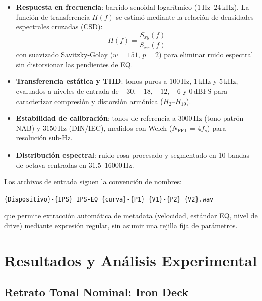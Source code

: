 \documentclass[10pt,conference]{IEEEtran}
\begin{document}
\begin{itemize}
    \item \textbf{Respuesta en frecuencia}: barrido senoidal logarítmico
    ($1\,\text{Hz}$–$24\,\text{kHz}$). La función de transferencia $H(f)$ se estimó mediante
    la relación de densidades espectrales cruzadas (CSD):
    \begin{equation}
        H(f) = \frac{S_{xy}(f)}{S_{xx}(f)}
    \end{equation}
    con suavizado Savitzky-Golay ($w=151$, $p=2$) para eliminar ruido espectral
    sin distorsionar las pendientes de EQ.

    \item \textbf{Transferencia estática y THD}: tonos puros a $100\,\text{Hz}$,
    $1\,\text{kHz}$ y $5\,\text{kHz}$, evaluados a niveles de entrada de $-30$, $-18$,
    $-12$, $-6$ y $0\,\text{dBFS}$ para caracterizar compresión y distorsión armónica
    ($H_2$–$H_{19}$).

    \item \textbf{Estabilidad de calibración}: tonos de referencia a $3000\,\text{Hz}$
    (tono patrón NAB) y $3150\,\text{Hz}$ (DIN/IEC), medidos con Welch ($N_{\text{FFT}}
    = 4f_s$) para resolución sub-Hz.

    \item \textbf{Distribución espectral}: ruido rosa procesado y segmentado en
    10 bandas de octava centradas en $31.5$–$16000\,\text{Hz}$.
\end{itemize}

Los archivos de entrada siguen la convención de nombres:
\begin{center}
\texttt{\{Dispositivo\}-\{IPS\}\_IPS-EQ\_\{curva\}-\{P1\}\_\{V1\}-\{P2\}\_\{V2\}.wav}
\end{center}
que permite extracción automática de metadata (velocidad, estándar EQ, nivel de drive)
mediante expresión regular, sin asumir una rejilla fija de parámetros.

\section{Resultados y Análisis Experimental}

\subsection{Retrato Tonal Nominal: Iron Deck}
\label{sec:retrato_iron}
\end{document}
